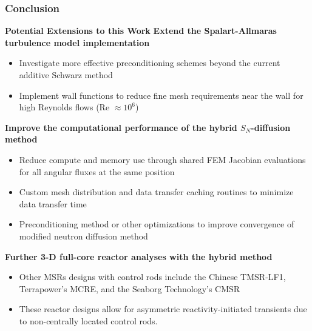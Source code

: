 \begin{frame}
  \frametitle{Conclusion}
  \begin{block}{\textbf{Potential Extensions to this Work}}
    \textbf{Extend the Spalart-Allmaras turbulence model implementation}
      \begin{itemize}
        \item Investigate more effective preconditioning schemes beyond the
          current additive Schwarz method
        \item Implement wall functions to reduce fine mesh requirements near the wall for high
          Reynolds flows (Re $\approx 10^6$)
      \end{itemize}
    \textbf{Improve the computational performance of the hybrid $S_N$-diffusion method}
      \begin{itemize}
        \item Reduce compute and memory use through shared FEM Jacobian evaluations for all angular
          fluxes at the same position
        \item Custom mesh distribution and data transfer caching routines to minimize data transfer time
        \item Preconditioning method or other optimizations to improve convergence of modified neutron diffusion
          method
      \end{itemize}
    \textbf{Further 3-D full-core reactor analyses with the hybrid method}
      \begin{itemize}
        \item Other MSRs designs with control rods include the Chinese TMSR-LF1,
          Terrapower's MCRE, and the Seaborg Technology's CMSR
        \item These reactor designs allow for asymmetric reactivity-initiated transients due to
          non-centrally located control rods.
      \end{itemize}
  \end{block}
\end{frame}
